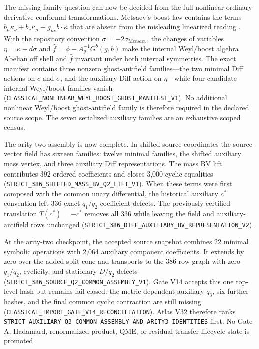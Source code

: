 \documentclass[11pt]{article}
\theoremstyle{definition}
\theoremstyle{remark}
\newcommand{\cert}[1]{\nolinkurl{#1}}
\begin{document}
The missing family question can now be decided from the full nonlinear
ordinary-derivative conformal transformations.  Metsaev's boost law contains
the terms $b_\mu\kappa_\nu+b_\nu\kappa_\mu-g_{\mu\nu}b\mathbin{\cdot}\kappa$
that are absent from the misleading linearized reading \cite{Metsaev2007}.
With the repository convention \(\sigma=-2\sigma_{\mathrm Metsaev}\), the
changes of variables \(\eta=\kappa-d\sigma\) and
\(\widehat f=\phi-A_g^{-1}G^b(g,b)\) make the internal Weyl/boost algebra
Abelian off shell and \(\widehat f\) invariant under both internal symmetries.
The exact manifest contains three nonzero ghost-antifield families---the two
minimal Diff actions on \(c\) and \(\sigma\), and the auxiliary Diff action on
\(\eta\)---while four candidate internal Weyl/boost families vanish
(\cert{CLASSICAL_NONLINEAR_WEYL_BOOST_GHOST_MANIFEST_V1}).  No additional
nonlinear Weyl/boost ghost-antifield family is therefore required in the
declared source scope.  The seven serialized auxiliary families are an
exhaustive scoped census.

The arity-two assembly is now complete.  In shifted source coordinates the
source vector field has sixteen families: twelve minimal families, the shifted
auxiliary mass vertex, and three auxiliary Diff representations.  The mass BV
lift contributes 392 ordered coefficients and closes 3,000 cyclic equalities
(\cert{STRICT_386_SHIFTED_MASS_BV_Q2_LIFT_V1}).  When these terms were first
composed with the common unary differential, the historical auxiliary
\(c^*\) convention left 336 exact \(q_1/q_2\) coefficient defects.  The
previously certified translation \(T(c^*)=-c^*\) removes all 336 while leaving
the field and auxiliary-antifield rows unchanged
(\cert{STRICT_386_DIFF_AUXILIARY_BV_REPRESENTATION_V2}).

At the arity-two checkpoint, the accepted source snapshot combines 22 minimal symbolic operations with
2,064 auxiliary component coefficients.  It extends by zero over the added
split cone and transports to the 386-row graph with zero \(q_1/q_2\),
cyclicity, and stationary \(D/q_2\) defects
(\cert{STRICT_386_SOURCE_Q2_COMMON_ASSEMBLY_V1}).  Gate V14 accepts this one
top-level hash but remains fail closed: the metric-dependent auxiliary
\(q_3\), six further hashes, and the final common cyclic contraction are still
missing (\cert{CLASSICAL_IMPORT_GATE_V14_RECONCILIATION}).  Atlas V32 therefore
ranks \cert{STRICT_AUXILIARY_Q3_COMMON_ASSEMBLY_AND_ARITY3_IDENTITIES} first.
No Gate-A, Hadamard, renormalized-product, QME, or residual-transfer lifecycle
state is promoted.
\end{document}
